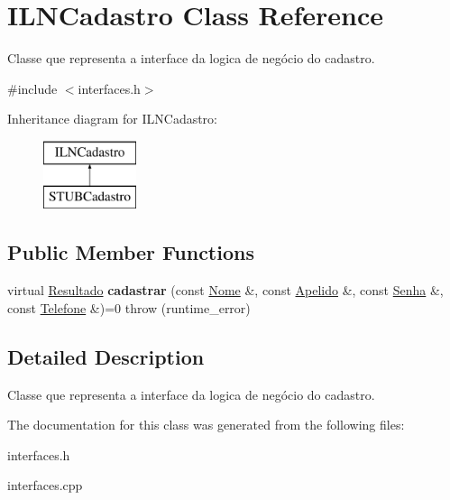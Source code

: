 \hypertarget{classILNCadastro}{}\section{I\+L\+N\+Cadastro Class Reference}
\label{classILNCadastro}


Classe que representa a interface da logica de negócio do cadastro.  




{\ttfamily \#include $<$interfaces.\+h$>$}

Inheritance diagram for I\+L\+N\+Cadastro\+:\begin{figure}[H]
\begin{center}
\leavevmode
\includegraphics[height=2.000000cm]{classILNCadastro}
\end{center}
\end{figure}
\subsection*{Public Member Functions}
\begin{DoxyCompactItemize}
\item 
\mbox{\label{classILNCadastro_a1cab10fe8bd4b2f8803ef1317aac9a86}} 
virtual \hyperlink{classResultado}{Resultado} {\bfseries cadastrar} (const \hyperlink{classNome}{Nome} \&, const \hyperlink{classApelido}{Apelido} \&, const \hyperlink{classSenha}{Senha} \&, const \hyperlink{classTelefone}{Telefone} \&)=0  throw (runtime\+\_\+error)
\end{DoxyCompactItemize}


\subsection{Detailed Description}
Classe que representa a interface da logica de negócio do cadastro. 

The documentation for this class was generated from the following files\+:\begin{DoxyCompactItemize}
\item 
interfaces.\+h\item 
interfaces.\+cpp\end{DoxyCompactItemize}
